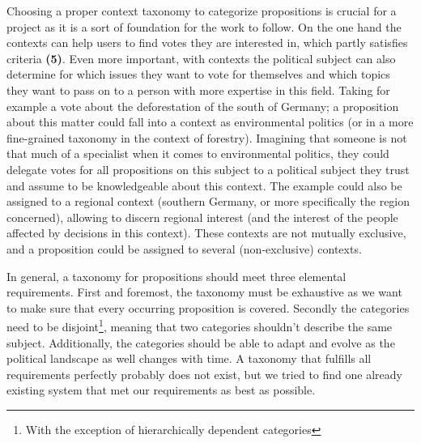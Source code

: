 Choosing a proper context taxonomy to categorize propositions is crucial for a  project as it is a sort of foundation for the work to follow.
On the one hand the contexts can help users to find votes they are interested in, which partly satisfies criteria \textbf{(5)}.
Even more important, with contexts the political subject can also determine for which issues they want to vote for themselves and which topics they want to pass on to a person with more expertise in this field.
Taking for example a vote about the deforestation of the south of Germany; a proposition about this matter could fall into a context as environmental politics (or in a more fine-grained taxonomy in the context of forestry).
Imagining that someone is not that much of a specialist when it comes to environmental politics, they could delegate votes for all propositions on this subject to a political subject they trust and assume to be knowledgeable about this context. The example could also be assigned to a regional context (southern Germany, or more specifically the region concerned), allowing to discern regional interest (and the interest of the people affected by decisions in this context). These contexts are not mutually exclusive, and a proposition could be assigned to several (non-exclusive) contexts.

In general, a taxonomy for  propositions should meet three elemental requirements.
First and foremost, the taxonomy must be exhaustive as we want to make sure that every occurring proposition is covered.
Secondly the categories need to be disjoint\footnote{With the exception of hierarchically dependent categories}, meaning that two categories shouldn't describe the same subject.
Additionally, the categories should be able to adapt and evolve as the political landscape as well changes with time.
A taxonomy that fulfills all requirements perfectly probably does not exist, but we tried to find one already existing system that met our requirements as best as possible.

